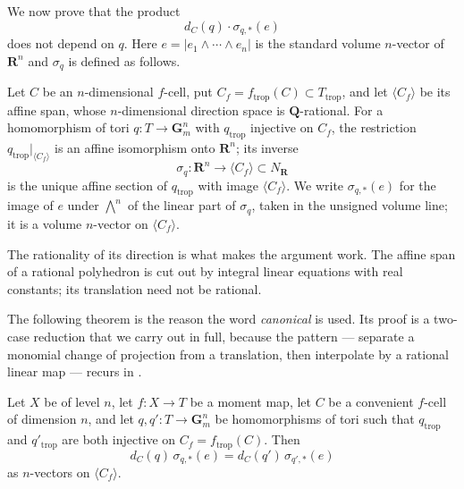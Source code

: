 We now prove that the product
\[
 d_C(q)\cdot\sigma_{q,*}(e)
\]
does not depend on $q$. Here $e=|e_1\wedge\cdots\wedge e_n|$ is the standard
volume $n$-vector of $\mathbf R^n$ and $\sigma_q$ is defined as follows.

\begin{definition}
\label{def:trop-affine-section}
Let $C$ be an $n$-dimensional $f$-cell, put
$C_f=f_{\mathrm{trop}}(C)\subset T_{\mathrm{trop}}$, and let
$\langle C_f\rangle$ be its affine span, whose $n$-dimensional direction
space is $\mathbf Q$-rational. For a homomorphism
of tori $q:T\to\mathbf G_m^n$ with $q_{\mathrm{trop}}$ injective on $C_f$,
the restriction $q_{\mathrm{trop}}|_{\langle C_f\rangle}$ is an affine
isomorphism onto $\mathbf R^n$; its inverse
\[
 \sigma_q:\mathbf R^n\longrightarrow\langle C_f\rangle\subset N_{\mathbf R}
\]
is the unique affine section of $q_{\mathrm{trop}}$ with image
$\langle C_f\rangle$. We write $\sigma_{q,*}(e)$ for the image of $e$ under
$\bigwedge^n$ of the linear part of $\sigma_q$, taken in the unsigned
volume line; it is a volume $n$-vector on
$\langle C_f\rangle$.
\end{definition}

The rationality of its direction is what makes the argument work. The
affine span of a rational polyhedron is cut out by integral linear
equations with real constants; its translation need not be rational.

The following theorem is the reason the word \emph{canonical} is used. Its
proof is a two-case reduction that we carry out in full, because the pattern
--- separate a monomial change of projection from a translation, then
interpolate by a rational linear map --- recurs in
.

\begin{theorem}
\label{thm:trop-calibration-canonical}
Let $X$ be of level $n$, let $f:X\to T$ be a moment map, let $C$ be a
convenient $f$-cell of dimension $n$, and let $q,q':T\to\mathbf G_m^n$ be
homomorphisms of tori such that $q_{\mathrm{trop}}$ and
$q'_{\mathrm{trop}}$ are both injective on $C_f=f_{\mathrm{trop}}(C)$. Then
\begin{equation}
\label{eq:trop-calibration-canonical}
 d_C(q)\,\sigma_{q,*}(e)=d_C(q')\,\sigma_{q',*}(e)
\end{equation}
as $n$-vectors on $\langle C_f\rangle$.
\end{theorem}

